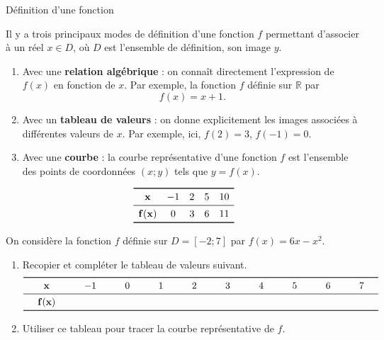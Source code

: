 \documentclass[11pt]{article}
\begin{document}
\begin{defi}{Définition d'une fonction}
  \begin{minipage}{.6\textwidth}
  Il y a trois principaux modes de définition d'une fonction $f$ permettant
  d'associer à un réel $x\in D$, où $D$ est l'ensemble de définition, son image
  $y$.
  \begin{enumerate}
    \item Avec une \textbf{relation algébrique} : on connaît directement
      l'expression de $f(x)$ en fonction de $x$. Par exemple, la fonction $f$
      définie sur $\mathbb{R}$ par
      \[
        f(x)=x+1.
      \]
    \item Avec un \textbf{tableau de valeurs} : on donne explicitement les
      images associées à différentes valeurs de $x$. Par exemple, ici,
      $f(2)=3$, $f(-1)=0$.
    \item Avec une \textbf{courbe} : la courbe représentative d'une fonction $f$ est
  l'ensemble des points de coordonnées $(x;y)$ tels que $y=f(x)$.
  \end{enumerate}
  \end{minipage}
    \begin{minipage}{.4\textwidth}
      \[
      \begin{array}[]{ccccc}
        \toprule
        \mathbf{x} & -1 & 2 & 5 & 10 \\
        \midrule
        \mathbf{f(x)} & 0 & 3 & 6 & 11\\
        \bottomrule
      \end{array}
    \]
    \begin{center}
    \end{center}
  \end{minipage}
\end{defi}
\begin{app}
  On considère la fonction $f$ définie sur $D=\left[ -2;7 \right]$ par
  $f(x)=6x-x^2$.
  \begin{enumerate}
    \item Recopier et compléter le tableau de valeurs suivant.
    \[
      \arraycolsep=15pt
      \begin{array}[]{cccccccccc}
        \toprule
        \mathbf{x} & -1 & 0 & 1 & 2 & 3 & 4 & 5 & 6 & 7 \\
        \midrule
        \mathbf{f(x)} & & & & & & & & & \\
        \bottomrule
      \end{array}
    \]
    \item Utiliser ce tableau pour tracer la courbe représentative de $f$.
  \end{enumerate}
\end{app}
\end{document}
